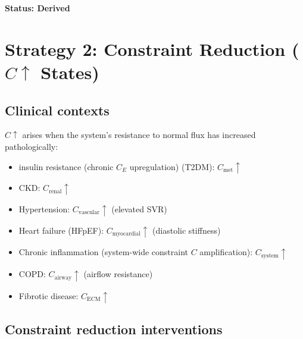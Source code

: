 \documentclass[12pt,a4paper]{article}
\begin{document}
\textbf{Status: Derived}

\section{Strategy 2: Constraint Reduction ($C \uparrow$ States)}

\subsection{Clinical contexts}

$C \uparrow$ arises when the system's resistance to normal flux has increased pathologically:
\begin{itemize}
    \item insulin resistance (chronic $C_E$ upregulation) (T2DM): $C_{\mathrm{met}} \uparrow$
    \item CKD: $C_{\mathrm{renal}} \uparrow$
    \item Hypertension: $C_{\mathrm{vascular}} \uparrow$ (elevated SVR)
    \item Heart failure (HFpEF): $C_{\mathrm{myocardial}} \uparrow$ (diastolic stiffness)
    \item Chronic inflammation (system-wide constraint $C$ amplification): $C_{\mathrm{system}} \uparrow$
    \item COPD: $C_{\mathrm{airway}} \uparrow$ (airflow resistance)
    \item Fibrotic disease: $C_{\mathrm{ECM}} \uparrow$
\end{itemize}

\subsection{Constraint reduction interventions}
\end{document}
